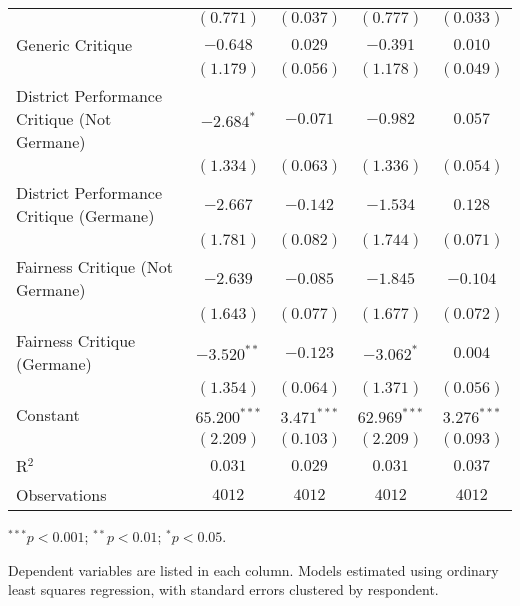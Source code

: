 \documentclass[12pt,letterpaper]{article}
\begin{document}
\begin{table}[H]
\begin{center}
{\begin{threeparttable}
\begin{tabular}{l c c c c}
				& $(0.771)$      & $(0.037)$     & $(0.777)$      & $(0.033)$     \\
				Generic Critique                                 & $-0.648$       & $0.029$       & $-0.391$       & $0.010$       \\
				& $(1.179)$      & $(0.056)$     & $(1.178)$      & $(0.049)$     \\
				District Performance Critique (Not Germane)      & $-2.684^{*}$   & $-0.071$      & $-0.982$       & $0.057$       \\
				& $(1.334)$      & $(0.063)$     & $(1.336)$      & $(0.054)$     \\
				District Performance Critique (Germane)          & $-2.667$       & $-0.142$      & $-1.534$       & $0.128$       \\
				& $(1.781)$      & $(0.082)$     & $(1.744)$      & $(0.071)$     \\
				Fairness Critique (Not Germane)                  & $-2.639$       & $-0.085$      & $-1.845$       & $-0.104$      \\
				& $(1.643)$      & $(0.077)$     & $(1.677)$      & $(0.072)$     \\
				Fairness Critique (Germane)                      & $-3.520^{**}$  & $-0.123$      & $-3.062^{*}$   & $0.004$       \\
				& $(1.354)$      & $(0.064)$     & $(1.371)$      & $(0.056)$     \\
				Constant                                         & $65.200^{***}$ & $3.471^{***}$ & $62.969^{***}$ & $3.276^{***}$ \\
				& $(2.209)$      & $(0.103)$     & $(2.209)$      & $(0.093)$     \\
				\midrule
				R$^2$                                            & $0.031$        & $0.029$       & $0.031$        & $0.037$       \\
				Observations                                     & $4012$         & $4012$        & $4012$         & $4012$        \\
				\bottomrule
			\end{tabular}
			\begin{tablenotes}[flushleft]
				\scriptsize{\item[\hspace{-5mm}] $^{***}p<0.001$; $^{**}p<0.01$; $^{*}p<0.05$. \item[\hspace{-5mm}] Dependent variables are listed in each column. Models estimated using ordinary least squares regression, 
					with standard errors clustered by respondent.}
			\end{tablenotes}
		\end{threeparttable}
	}
	\label{tab:table3}
\end{center}
\end{table}
\end{document}

